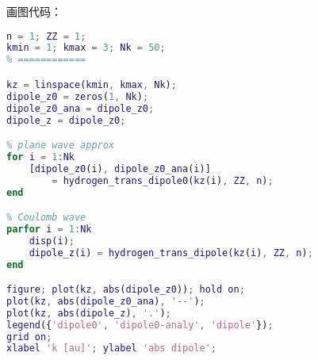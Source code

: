 画图代码：
\begin{lstlisting}[language=matlab,caption=plot\_hydrogen\_trans\_dipole.m]
% == params ==
n = 1; ZZ = 1;
kmin = 1; kmax = 3; Nk = 50;
% ============

kz = linspace(kmin, kmax, Nk);
dipole_z0 = zeros(1, Nk);
dipole_z0_ana = dipole_z0;
dipole_z = dipole_z0;

% plane wave approx
for i = 1:Nk
    [dipole_z0(i), dipole_z0_ana(i)]
        = hydrogen_trans_dipole0(kz(i), ZZ, n);
end

% Coulomb wave
parfor i = 1:Nk
    disp(i);
    dipole_z(i) = hydrogen_trans_dipole(kz(i), ZZ, n);
end

figure; plot(kz, abs(dipole_z0)); hold on;
plot(kz, abs(dipole_z0_ana), '--');
plot(kz, abs(dipole_z), '.');
legend({'dipole0', 'dipole0-analy', 'dipole'});
grid on;
xlabel 'k [au]'; ylabel 'abs dipole';
\end{lstlisting}
